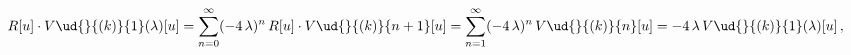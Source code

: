 \begin{equation*}
  R[u] \cdot V\ud{}{(k)}{1}(\lambda)[u] = \sum_{{{n}}=0}^{\infty}(-4\,\lambda)^{{n}}
\,  R[u] \cdot V\ud{}{(k)}{n+1}[u] =
\sum_{{{n}}=1}^{\infty}(-4\,\lambda)^{{n}} \, V\ud{}{(k)}{n}[u] = -4
\,\lambda\, V\ud{}{(k)}{1}(\lambda)[u]\,,
\end{equation*}

